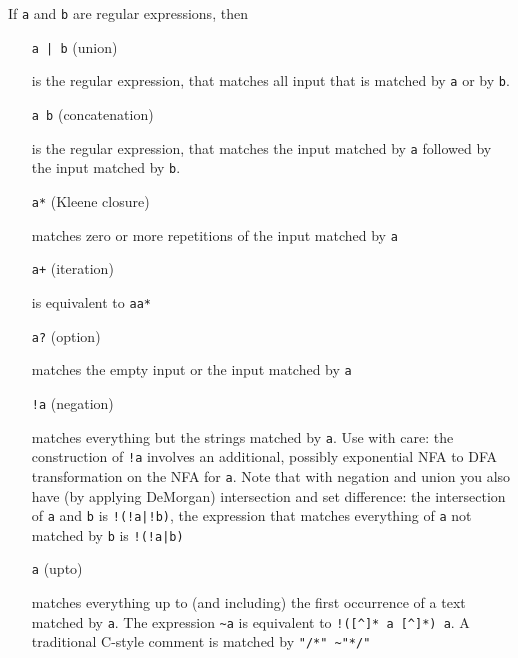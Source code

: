 \documentclass[11pt]{scrartcl}
\begin{document}
    If \texttt{a} and \texttt{b} are regular expressions, then

    \begin{itemize}
     
          \item[\texttt{a | b}] (union) 

            is the regular expression, that matches
            all input that is matched by \texttt{a} or by \texttt{b}.
          
          
          \item[\texttt{a b}] (concatenation) 
            
            is the regular expression,
            that matches the input matched by \texttt{a} followed by the 
            input matched by \texttt{b}.
          
          
          \item[\texttt{a*}] (Kleene closure) 

            matches zero or more repetitions
            of the input matched by \texttt{a}
          
          
          \item[\texttt{a+}] (iteration)

          is equivalent to \texttt{aa*}
          
          
          \item[\texttt{a?}] (option)

          matches the empty input or the input matched
            by \texttt{a}

          \item[\texttt{!a}] (negation)

          matches everything but the strings matched by \texttt{a}. 
          Use with care: the construction of \verb+!a+ involves
          an additional, possibly exponential NFA to DFA transformation 
          on the NFA for \texttt{a}. Note that
          with negation and union you also have (by applying DeMorgan)
          intersection and set difference: the intersection of 
          \texttt{a} and \texttt{b} is \verb+!(!a|!b)+, the expression 
          that matches everything of \texttt{a} not matched by \texttt{b} is 
          \verb+!(!a|b)+

          \item[\texttt{\symbol{126}a}] (upto)

          matches everything up to (and including) the first occurrence of a text
          matched by \texttt{a}. The expression \verb-~a- is equivalent
          to \verb-!([^]* a [^]*) a-. A traditional C-style comment
          is matched by \verb-"/*" ~"*/"-
          

\end{itemize}
\end{document}
